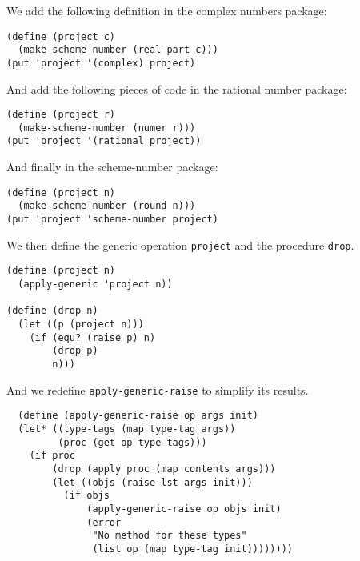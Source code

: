 \documentclass[a4paper,12pt]{article}
\begin{document}
We add the following definition in the complex numbers package:
\begin{lstlisting}
(define (project c)
  (make-scheme-number (real-part c)))
(put 'project '(complex) project)
\end{lstlisting}
And add the following pieces of code in the rational number package:
\begin{lstlisting}
(define (project r)
  (make-scheme-number (numer r)))
(put 'project '(rational project))
\end{lstlisting}
And finally in the scheme-number package:
\begin{lstlisting}
(define (project n)
  (make-scheme-number (round n)))
(put 'project 'scheme-number project)
\end{lstlisting}
We then define the generic operation \lstinline!project! and the
procedure \lstinline!drop!.
\begin{lstlisting}
(define (project n)
  (apply-generic 'project n))

(define (drop n)
  (let ((p (project n)))
    (if (equ? (raise p) n)
        (drop p)
        n)))
\end{lstlisting}
And we redefine \lstinline!apply-generic-raise! to simplify its
results.
\begin{lstlisting}
  (define (apply-generic-raise op args init)
  (let* ((type-tags (map type-tag args))
         (proc (get op type-tags)))
    (if proc
        (drop (apply proc (map contents args)))
        (let ((objs (raise-lst args init)))
          (if objs
              (apply-generic-raise op objs init)
              (error
               "No method for these types"
               (list op (map type-tag init))))))))
\end{lstlisting}
\end{document}

